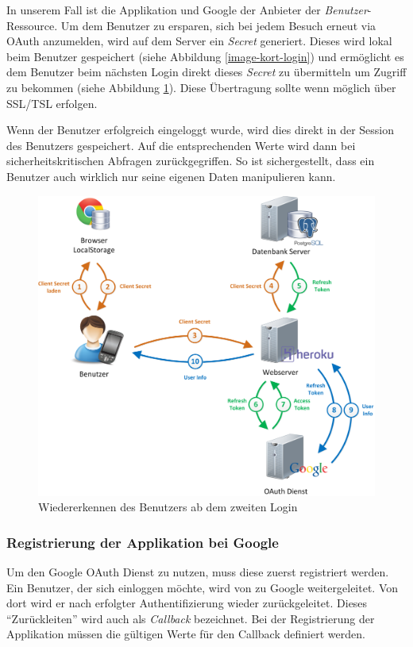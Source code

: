 In unserem Fall ist \kort{} die Applikation und Google der Anbieter der \emph{Benutzer}-Ressource.
Um dem Benutzer zu ersparen, sich bei jedem Besuch erneut via \gls{OAuth} anzumelden, wird auf dem Server ein \emph{Secret} generiert.
Dieses wird lokal beim Benutzer gespeichert (siehe Abbildung \ref{image-kort-login}) und ermöglicht es dem Benutzer beim nächsten Login direkt dieses \emph{Secret} zu übermitteln um Zugriff zu bekommen (siehe Abbildung \ref{image-kort-relogin}).
Diese Übertragung sollte wenn möglich über SSL/TSL erfolgen.

Wenn der Benutzer erfolgreich eingeloggt wurde, wird dies direkt in der Session des Benutzers gespeichert.
Auf die entsprechenden Werte wird dann bei sicherheitskritischen Abfragen zurückgegriffen.
So ist sichergestellt, dass ein Benutzer auch wirklich nur seine eigenen Daten manipulieren kann.

\begin{figure}[H]
	\centering
	\includegraphics[scale=0.4]{images/implementation/backend/kort-relogin}
	\caption{Wiedererkennen des Benutzers ab dem zweiten Login}
	\label{image-kort-relogin}
\end{figure}

\subsubsection{Registrierung der Applikation bei Google}
Um den Google \gls{OAuth} Dienst zu nutzen, muss diese zuerst registriert werden.
Ein Benutzer, der sich einloggen möchte, wird von \kort{} zu Google weitergeleitet.
Von dort wird er nach erfolgter Authentifizierung wieder zurückgeleitet.
Dieses "`Zurückleiten"' wird auch als \emph{Callback} bezeichnet.
Bei der Registrierung der Applikation müssen die gültigen Werte für den Callback definiert werden.

